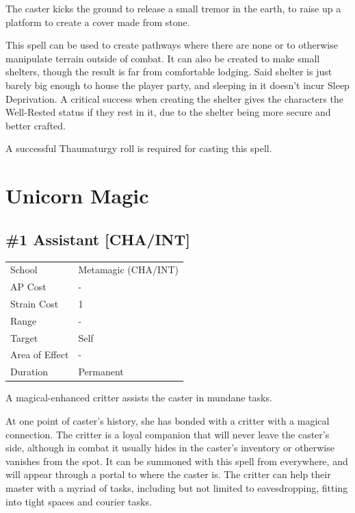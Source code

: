 \documentclass[11pt,a4paper,twocolumn]{book}
\begin{document}
\medskip

The caster kicks the ground to release a small tremor in the earth, to raise up a platform to create a cover made from stone.

This spell can be used to create pathways where there are none or to otherwise manipulate terrain outside of combat.
It can also be created to make small shelters, though the result is far from comfortable lodging. Said shelter is just barely big enough to house the player party, and sleeping in it doesn't incur Sleep Deprivation. A critical success when creating the shelter gives the characters the Well-Rested status if they rest in it, due to the shelter being more secure and better crafted.

A successful Thaumaturgy roll is required for casting this spell.

\chapter{Unicorn Magic}


\section*{\#1 Assistant [CHA/INT]}
{
	\begin{tabu} to 75mm{| X[l,4] | X[l,7] |}
		\hline
		School 			& Metamagic (CHA/INT) 	\\
        AP Cost	      	& - 				\\
        Strain Cost     & 1 				\\
        Range     		& - 				\\
        Target      	& Self 				\\
        Area of Effect  & - 	 			\\
        Duration     	& Permanent 		\\ \hline
	\end{tabu}
		
}

\medskip

A magical-enhanced critter assists the caster in mundane tasks.

At one point of caster's history, she has bonded with a critter with a magical connection. The critter is a loyal companion that will never leave the caster's side, although in combat it usually hides in the caster's inventory or otherwise vanishes from the spot. It can be summoned with this spell from everywhere, and will appear through a portal to where the caster is. The critter can help their master with a myriad of tasks, including but not limited to eavesdropping, fitting into tight spaces and courier tasks.
\end{document}
